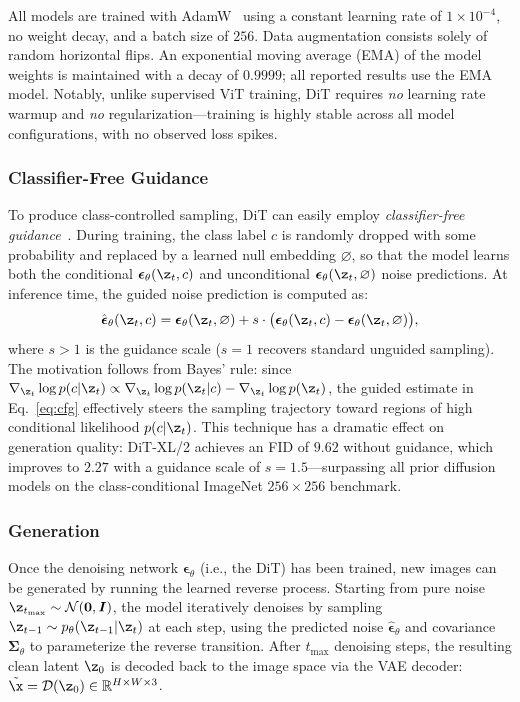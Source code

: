\documentclass[../../book-main.tex]{subfiles}
\begin{document}
All models are trained with AdamW~\citep{loshchilov2019decoupled}
using a constant learning rate of $1 \times 10^{-4}$, no weight
decay, and a batch size of $256$. Data augmentation consists solely
of random horizontal flips. An exponential moving average (EMA) of
the model weights is maintained with a decay of $0.9999$; all
reported results use the EMA model. Notably, unlike supervised ViT
training, DiT requires \emph{no} learning rate warmup and \emph{no}
regularization---training is highly stable across all model
configurations, with no observed loss spikes.

\subsubsection{Classifier-Free Guidance}
To produce class-controlled sampling, DiT can easily employ
\emph{classifier-free guidance}~\citep{ho2022classifier}. During
training, the class label $c$ is randomly dropped with some
probability and replaced by a learned null embedding $\varnothing$,
so that the model learns both the conditional
$\boldsymbol{\epsilon}_\theta(\z_t, c)$ and unconditional
$\boldsymbol{\epsilon}_\theta(\z_t, \varnothing)$ noise predictions.
At inference time, the guided noise prediction is computed as:
\begin{equation}
\hat{\boldsymbol{\epsilon}}_\theta(\z_t, c) =
\boldsymbol{\epsilon}_\theta(\z_t, \varnothing) + s \cdot
\big(\boldsymbol{\epsilon}_\theta(\z_t, c) -
\boldsymbol{\epsilon}_\theta(\z_t, \varnothing)\big),
\label{eq:cfg}
\end{equation}
where $s > 1$ is the guidance scale ($s = 1$ recovers standard
unguided sampling). The motivation follows from Bayes' rule: since
$\nabla_{\z_t} \log p(c | \z_t) \propto \nabla_{\z_t} \log p(\z_t |
c) - \nabla_{\z_t} \log p(\z_t)$, the guided estimate in
Eq.~\eqref{eq:cfg} effectively steers the sampling trajectory toward
regions of high conditional likelihood $p(c | \z_t)$. This technique
has a dramatic effect on generation quality: DiT-XL/2 achieves an FID
of $9.62$ without guidance, which improves to $2.27$ with a guidance
scale of $s = 1.5$---surpassing all prior diffusion models on the
class-conditional ImageNet $256 \times 256$ benchmark.

\subsubsection{Generation}
Once the denoising network $\boldsymbol{\epsilon}_\theta$ (i.e., the
DiT) has been trained, new images can be generated by running the
learned reverse process. Starting from pure noise $\z_{t_{\max}} \sim
\mathcal{N}(\boldsymbol{0}, \boldsymbol{I})$, the model iteratively
denoises by sampling $\z_{t-1} \sim p_\theta(\z_{t-1} | \z_t)$ at
each step, using the predicted noise
$\hat{\boldsymbol{\epsilon}}_\theta$ and covariance
$\boldsymbol{\Sigma}_\theta$ to parameterize the reverse transition.
After $t_{\max}$ denoising steps, the resulting clean latent $\z_0$
is decoded back to the image space via the VAE decoder: $\tilde{\x} =
\mathcal{D}(\z_0) \in \mathbb{R}^{H \times W \times 3}$.
\end{document}
